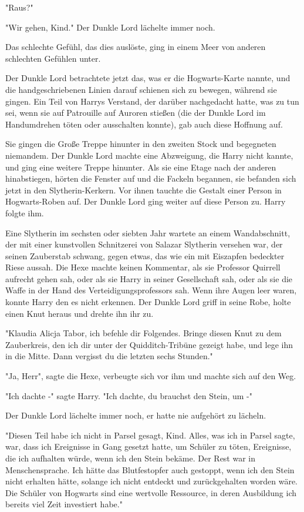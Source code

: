 {"Raus?"

"Wir gehen, Kind." Der Dunkle Lord lächelte immer noch.

Das schlechte Gefühl, das dies auslöste, ging in einem Meer von anderen schlechten Gefühlen unter.

Der Dunkle Lord betrachtete jetzt das, was er die Hogwarts-Karte nannte, und die handgeschriebenen Linien darauf schienen sich zu bewegen, während sie gingen. Ein Teil von Harrys Verstand, der darüber nachgedacht hatte, was zu tun sei, wenn sie auf Patrouille auf Auroren stießen (die der Dunkle Lord im Handumdrehen töten oder ausschalten konnte), gab auch diese Hoffnung auf.

Sie gingen die Große Treppe hinunter in den zweiten Stock und begegneten niemandem. Der Dunkle Lord machte eine Abzweigung, die Harry nicht kannte, und ging eine weitere Treppe hinunter. Als sie eine Etage nach der anderen hinabstiegen, hörten die Fenster auf und die Fackeln begannen, sie befanden sich jetzt in den Slytherin-Kerkern. Vor ihnen tauchte die Gestalt einer Person in Hogwarts-Roben auf. Der Dunkle Lord ging weiter auf diese Person zu. Harry folgte ihm.

Eine Slytherin im sechsten oder siebten Jahr wartete an einem Wandabschnitt, der mit einer kunstvollen Schnitzerei von Salazar Slytherin versehen war, der seinen Zauberstab schwang, gegen etwas, das wie ein mit Eiszapfen bedeckter Riese aussah. Die Hexe machte keinen Kommentar, als sie Professor Quirrell aufrecht gehen sah, oder als sie Harry in seiner Gesellschaft sah, oder als sie die Waffe in der Hand des Verteidigungsprofessors sah. Wenn ihre Augen leer waren, konnte Harry den es nicht erkennen. Der Dunkle Lord griff in seine Robe, holte einen Knut heraus und drehte ihn ihr zu.

"Klaudia Alicja Tabor, ich befehle dir Folgendes. Bringe diesen Knut zu dem Zauberkreis, den ich dir unter der Quidditch-Tribüne gezeigt habe, und lege ihn in die Mitte. Dann vergisst du die letzten sechs Stunden."

"Ja, Herr", sagte die Hexe, verbeugte sich vor ihm und machte sich auf den Weg.

"Ich dachte -" sagte Harry. "Ich dachte, du brauchst den Stein, um -"

Der Dunkle Lord lächelte immer noch, er hatte nie aufgehört zu lächeln.

"Diesen Teil habe ich nicht in Parsel gesagt, Kind. Alles, was ich in Parsel sagte, war, dass ich Ereignisse in Gang gesetzt hatte, um Schüler zu töten, Ereignisse, die ich aufhalten würde, wenn ich den Stein bekäme. Der Rest war in Menschensprache. Ich hätte das Blutfestopfer auch gestoppt, wenn ich den Stein nicht erhalten hätte, solange ich nicht entdeckt und zurückgehalten worden wäre. Die Schüler von Hogwarts sind eine wertvolle Ressource, in deren Ausbildung ich bereits viel Zeit investiert habe."

}
